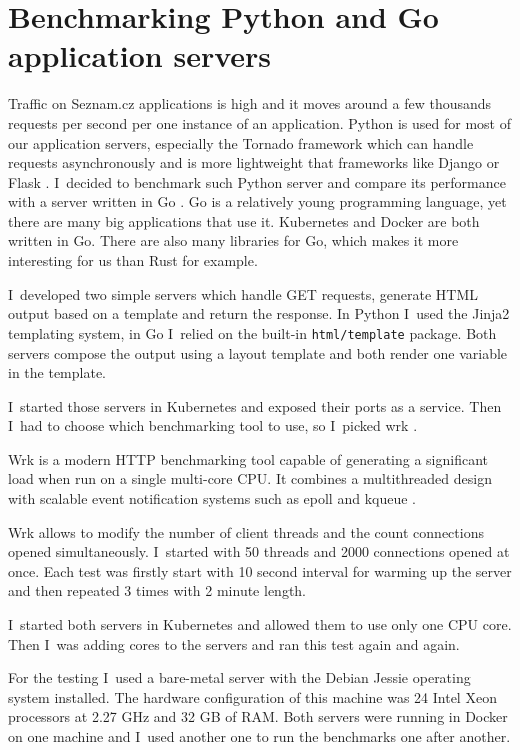 \chapter{Benchmarking Python and Go application servers}

Traffic on Seznam.cz applications is high and it moves around a few thousands requests per second per one instance of an application. Python \cite{python} is used for most of our application servers, especially the Tornado framework \cite{tornado} which can handle requests asynchronously and is more lightweight \cite{flask-django-tornado} that frameworks like Django \cite{django} or Flask \cite{flask}. I~decided to benchmark such Python server and compare its performance with a server written in Go \cite{golang}. Go is a relatively young programming language, yet there are many big applications that use it. Kubernetes and Docker are both written in Go. There are also many libraries for Go, which makes it more interesting for us than Rust for example.

I~developed two simple servers which handle GET requests, generate HTML output based on a template and return the response. In Python I~used the Jinja2 \cite{jinja2} templating system, in Go I~relied on the built-in \lstinline{html/template} package. Both servers compose the output using a layout template and both render one variable in the template.

I~started those servers in Kubernetes and exposed their ports as a service. Then I~had to choose which benchmarking tool to use, so I~picked wrk \cite{wrk}.
 
Wrk is a modern HTTP benchmarking tool capable of generating a significant load when run on a single multi-core CPU. It combines a multithreaded design with scalable event notification systems such as epoll and kqueue \cite{wrk}.

Wrk allows to modify the number of client threads and the count connections opened simultaneously. I~started with 50 threads and 2000 connections opened at once. Each test was firstly start with 10 second interval for warming up the server and then repeated 3 times with 2 minute length.

I~started both servers in Kubernetes and allowed them to use only one CPU core. Then I~was adding cores to the servers and ran this test again and again.

For the testing I~used a bare-metal server with the Debian Jessie operating system installed. The hardware configuration of this machine was 24 Intel Xeon processors at 2.27 GHz and 32 GB of RAM. Both servers were running in Docker on one machine and I~used another one to run the benchmarks one after another.

